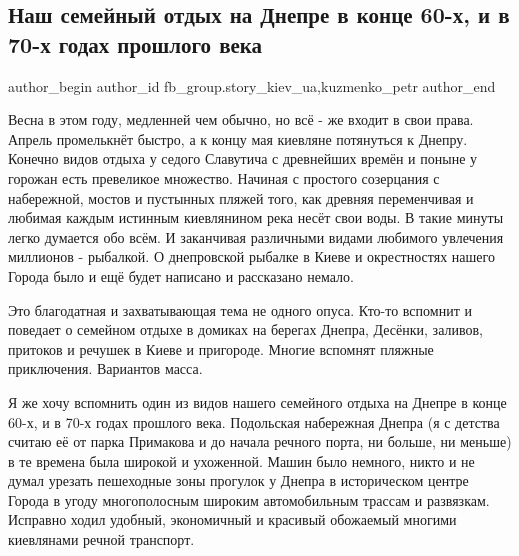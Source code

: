  
 
 
 
 
 
\subsection{Наш семейный отдых на Днепре в конце 60-х, и в 70-х годах прошлого века}
\label{sec:30_03_2021.fb.fb_group.story_kiev_ua.1.dnepr_semja_otdyh}
 
\ifcmt
 author_begin
   author_id fb_group.story_kiev_ua,kuzmenko_petr
 author_end
\fi

Весна в этом году, медленней чем обычно, но всё - же входит в свои права.
Апрель промелькнёт быстро, а к концу мая киевляне потянуться к Днепру. Конечно
видов отдыха у седого Славутича с древнейших времён и поныне у горожан есть
превеликое множество. Начиная с простого созерцания с набережной, мостов и
пустынных пляжей того, как древняя переменчивая и любимая каждым истинным
киевлянином река несёт свои воды. В такие минуты легко думается обо всём. И
заканчивая различными видами любимого увлечения миллионов - рыбалкой. О
днепровской рыбалке в Киеве и окрестностях нашего Города было и ещё будет
написано и рассказано немало. 

Это благодатная и захватывающая тема не одного опуса. Кто-то вспомнит и
поведает о семейном отдыхе в домиках на берегах Днепра, Десёнки, заливов,
притоков и речушек в Киеве и пригороде. Многие вспомнят пляжные приключения.
Вариантов масса. 

Я же хочу вспомнить один из видов нашего семейного отдыха на Днепре в конце
60-х, и в 70-х годах прошлого века. Подольская набережная Днепра (я с детства
считаю её от парка Примакова и до начала речного порта, ни больше, ни меньше) в
те времена была широкой и ухоженной. Машин было немного, никто и не думал
урезать пешеходные зоны прогулок у Днепра в историческом центре Города в угоду
многополосным широким автомобильным трассам и развязкам. Исправно ходил
удобный, экономичный и красивый обожаемый многими киевлянами речной транспорт. 

